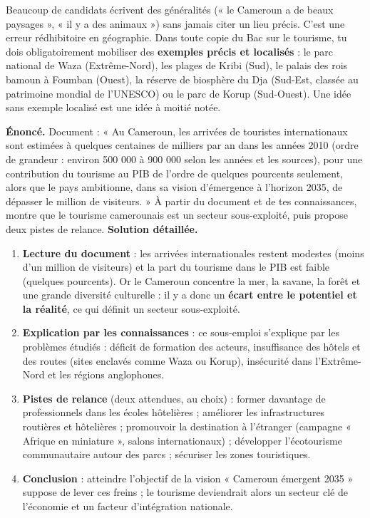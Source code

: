 \documentclass[11pt]{article}
\newcommand{\cle}[1]{{\popxbold\color{popdark}#1}}
\begin{document}
\begin{attention}
Beaucoup de candidats écrivent des généralités (« le Cameroun a de beaux paysages », « il y a des animaux ») sans jamais citer un lieu précis. C'est une erreur rédhibitoire en géographie. Dans toute copie du Bac sur le tourisme, tu dois obligatoirement mobiliser des \textbf{exemples précis et localisés} : le parc national de \cle{Waza} (Extrême-Nord), les plages de \cle{Kribi} (Sud), le palais des rois bamoun à \cle{Foumban} (Ouest), la réserve de biosphère du \cle{Dja} (Sud-Est, classée au patrimoine mondial de l'UNESCO) ou le parc de \cle{Korup} (Sud-Ouest). Une idée sans exemple localisé est une idée à moitié notée.
\end{attention}

\begin{exoresolu}
\textbf{Énoncé.} Document : « Au Cameroun, les arrivées de touristes internationaux sont estimées à quelques centaines de milliers par an dans les années 2010 (ordre de grandeur : environ 500 000 à 900 000 selon les années et les sources), pour une contribution du tourisme au PIB de l'ordre de quelques pourcents seulement, alors que le pays ambitionne, dans sa vision d'émergence à l'horizon 2035, de dépasser le million de visiteurs. » À partir du document et de tes connaissances, montre que le tourisme camerounais est un secteur sous-exploité, puis propose deux pistes de relance.
\tcblower
\textbf{Solution détaillée.}
\begin{enumerate}
\item \textbf{Lecture du document} : les arrivées internationales restent modestes (moins d'un million de visiteurs) et la part du tourisme dans le PIB est faible (quelques pourcents). Or le Cameroun concentre la mer, la savane, la forêt et une grande diversité culturelle : il y a donc un \textbf{écart entre le potentiel et la réalité}, ce qui définit un secteur sous-exploité.
\item \textbf{Explication par les connaissances} : ce sous-emploi s'explique par les problèmes étudiés : déficit de formation des acteurs, insuffisance des hôtels et des routes (sites enclavés comme Waza ou Korup), insécurité dans l'Extrême-Nord et les régions anglophones.
\item \textbf{Pistes de relance} (deux attendues, au choix) : former davantage de professionnels dans les écoles hôtelières ; améliorer les infrastructures routières et hôtelières ; promouvoir la destination à l'étranger (campagne « Afrique en miniature », salons internationaux) ; développer l'écotourisme communautaire autour des parcs ; sécuriser les zones touristiques.
\item \textbf{Conclusion} : atteindre l'objectif de la vision « Cameroun émergent 2035 » suppose de lever ces freins ; le tourisme deviendrait alors un secteur clé de l'économie et un facteur d'intégration nationale.
\end{enumerate}
\end{exoresolu}
\end{document}
